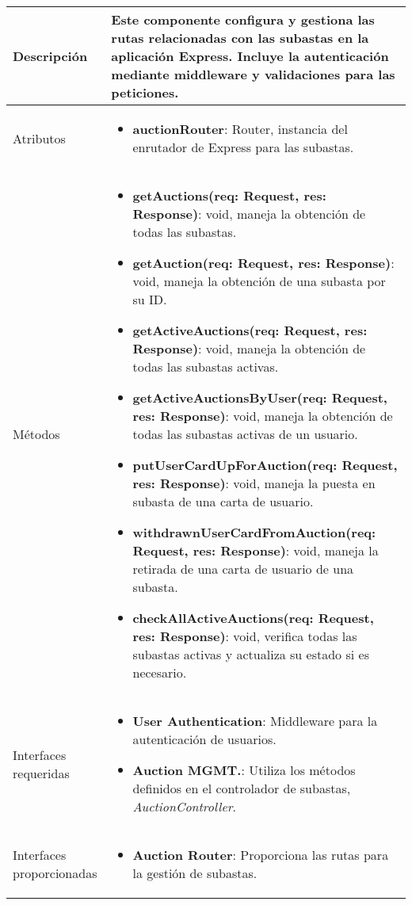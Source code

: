\begin{longtable}{
    >{\columncolor{lightgreen!20}}p{4cm}
    p{12cm}
    }
    \midrule
    Descripción & Este componente configura y gestiona las rutas relacionadas con las subastas en la aplicación Express. Incluye la autenticación mediante middleware y validaciones para las peticiones. \\
    \midrule
    Atributos & \begin{itemize}[nosep,leftmargin=*]
      \item \textbf{auctionRouter}: Router, instancia del enrutador de Express para las subastas.
    \end{itemize} \\
    \midrule
    Métodos & \begin{itemize}[nosep,leftmargin=*]
      \item \textbf{getAuctions(req: Request, res: Response)}: void, maneja la obtención de todas las subastas.
      \item \textbf{getAuction(req: Request, res: Response)}: void, maneja la obtención de una subasta por su ID.
      \item \textbf{getActiveAuctions(req: Request, res: Response)}: void, maneja la obtención de todas las subastas activas.
      \item \textbf{getActiveAuctionsByUser(req: Request, res: Response)}: void, maneja la obtención de todas las subastas activas de un usuario.
      \item \textbf{putUserCardUpForAuction(req: Request, res: Response)}: void, maneja la puesta en subasta de una carta de usuario.
      \item \textbf{withdrawnUserCardFromAuction(req: Request, res: Response)}: void, maneja la retirada de una carta de usuario de una subasta.
      \item \textbf{checkAllActiveAuctions(req: Request, res: Response)}: void, verifica todas las subastas activas y actualiza su estado si es necesario.
    \end{itemize} \\
    \midrule
    Interfaces requeridas &  \begin{itemize}[nosep,leftmargin=*]
      \item \textbf{User Authentication}: Middleware para la autenticación de usuarios.
      \item \textbf{Auction MGMT.}: Utiliza los métodos definidos en el controlador de subastas, \textit{AuctionController}.
    \end{itemize} \\
    \midrule
    Interfaces proporcionadas & \begin{itemize}[nosep,leftmargin=*]
      \item \textbf{Auction Router}: Proporciona las rutas para la gestión de subastas.
    \end{itemize} \\
    \end{longtable}

